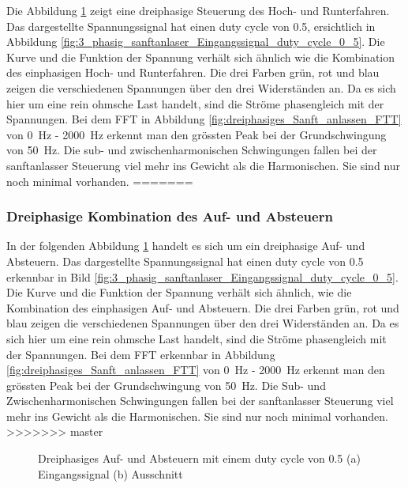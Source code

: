 Die Abbildung \ref{fig:drei_phasiges_Sanft_anlassen} zeigt eine dreiphasige  Steuerung des Hoch- und Runterfahren. Das dargestellte Spannungssignal hat einen duty cycle von 0.5, ersichtlich in Abbildung \ref{fig:3_phasig_sanftanlaser_Eingangssignal_duty_cycle_0_5}. Die Kurve und die Funktion der Spannung verhält sich ähnlich wie die Kombination des einphasigen Hoch- und Runterfahren. Die drei Farben grün, rot und blau zeigen die verschiedenen Spannungen über den drei Widerständen an. Da es sich hier um eine rein ohmsche Last handelt, sind die Ströme phasengleich  mit der Spannungen. Bei dem FFT in Abbildung \ref{fig:dreiphasiges_Sanft_anlassen_FTT} von \SI{0}{Hz} - \SI{2000}{Hz} erkennt man den grössten Peak bei der Grundschwingung von \SI{50}{Hz}. Die sub- und zwischenharmonischen Schwingungen fallen bei der sanftanlasser Steuerung viel mehr ins Gewicht als die Harmonischen. Sie sind nur noch minimal vorhanden.   
=======



\subsubsection{Dreiphasige Kombination des Auf- und Absteuern}

In der folgenden Abbildung \ref{fig:drei_phasiges_Sanft_anlassen} handelt es sich um ein dreiphasige Auf- und Absteuern. Das dargestellte Spannungssignal hat einen duty cycle von 0.5 erkennbar in Bild \ref{fig:3_phasig_sanftanlaser_Eingangssignal_duty_cycle_0_5}. Die Kurve und die Funktion der Spannung verhält sich ähnlich, wie die Kombination des einphasigen Auf- und Absteuern. Die drei Farben grün, rot und blau zeigen die verschiedenen Spannungen über den drei Widerständen an. Da es sich hier um eine rein ohmsche Last handelt, sind die Ströme phasengleich  mit der Spannungen. Bei dem FFT erkennbar in Abbildung \ref{fig:dreiphasiges_Sanft_anlassen_FTT} von \SI{0}{Hz} - \SI{2000}{Hz} erkennt man den grössten Peak bei der Grundschwingung von \SI{50}{Hz}. Die Sub- und Zwischenharmonischen Schwingungen fallen bei der sanftanlasser Steuerung viel mehr ins Gewicht als die Harmonischen. Sie sind nur noch minimal vorhanden.   
>>>>>>> master


\begin{figure}[ht!]
	\centering
	\qquad
	\caption{Dreiphasiges Auf- und Absteuern mit einem duty cycle von 0.5 (a) Eingangssignal (b) Ausschnitt}
	\label{fig:drei_phasiges_Sanft_anlassen}
\end{figure}

